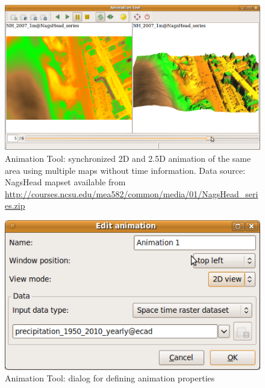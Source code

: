 \documentclass[a4paper,12pt,oneside]{book}
\newcommand{\at}{Animation Tool\xspace}
\begin{document}
\begin{figure}[h!]
  \centering
  \includegraphics{./images/animation_tool2.png}
  \caption[\at: synchronized 2D and 2.5D animation of the same area using
  multiple maps without time information]
  {\at: synchronized 2D and 2.5D animation of the same area using
  multiple maps without time information. Data source: NagsHead mapset available from
  \url{http://courses.ncsu.edu/mea582/common/media/01/NagsHead_series.zip}}
  \label{fig:anim3D}
\end{figure}

\begin{figure}[h!]
  \centering
  \includegraphics{./images/animation_tool_edit.png}
  \caption{\at: dialog for defining animation properties}
  \label{fig:anim_edit}
\end{figure}
\end{document}
